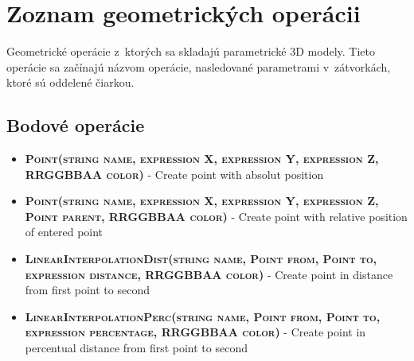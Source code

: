 \chapter{Zoznam geometrických operácii}
\label{Priloha:zoznamGeometrickychOperacii}
Geometrické operácie z~ktorých sa skladajú parametrické 3D modely. Tieto operácie sa začínajú názvom operácie, nasledované parametrami v~zátvorkách, ktoré sú oddelené čiarkou.

\section*{Bodové operácie}
\begin{itemize}


\item \textsc{\textbf{Point(string name, expression X, expression Y, expression Z, RRGGBBAA color)}} - Create point with absolut position
\item \textsc{\textbf{Point(string name, expression X, expression Y, expression Z, Point parent, RRGGBBAA color)}} - Create point with relative position of entered point

\item \textsc{\textbf{LinearInterpolationDist(string name, Point from, Point to, expression distance, RRGGBBAA color)}} - Create point in distance from first point to second
		 
\item \textsc{\textbf{LinearInterpolationPerc(string name, Point from, Point to, expression percentage, RRGGBBAA color)}} - Create point in percentual distance from first point to second


\end{itemize}
